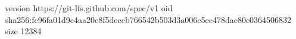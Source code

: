 version https://git-lfs.github.com/spec/v1
oid sha256:fc96fa01d9c4aa20c8f5deecb766542b503d3a006c5ec478dae80e0364506832
size 12384
